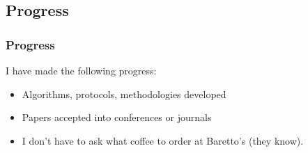 \documentclass[compress]{beamer}
\begin{document}
\subsection{Progress}

\begin{frame}
\frametitle{Progress}
I have made the following progress:
\begin{itemize}
\item<2> Algorithms, protocols, methodologies developed
\item<3> Papers accepted into conferences or journals
\item<4> I don't have to ask what coffee to order at Baretto's (they know).
\end{itemize}
\end{frame}
\end{document}
